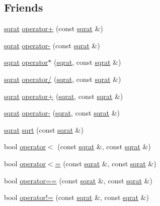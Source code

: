 \subsection*{Friends}
\begin{DoxyCompactItemize}
\item 
\mbox{\hyperlink{classsqrat}{sqrat}} \mbox{\hyperlink{classsqrat_a5a4ae2683cd1f23c81c09229d1dcc34a}{operator+}} (const \mbox{\hyperlink{classsqrat}{sqrat}} \&)
\item 
\mbox{\hyperlink{classsqrat}{sqrat}} \mbox{\hyperlink{classsqrat_ade89f3d4e5e8de405db9e23a1420d332}{operator-\/}} (const \mbox{\hyperlink{classsqrat}{sqrat}} \&)
\item 
\mbox{\hyperlink{classsqrat}{sqrat}} \mbox{\hyperlink{classsqrat_a0f75e7f8b43c76214b0845eadbfbfe6b}{operator$\ast$}} (\mbox{\hyperlink{classsqrat}{sqrat}}, const \mbox{\hyperlink{classsqrat}{sqrat}} \&)
\item 
\mbox{\hyperlink{classsqrat}{sqrat}} \mbox{\hyperlink{classsqrat_aa6e76248a9ec776743e60e5db8b3cb6d}{operator/}} (\mbox{\hyperlink{classsqrat}{sqrat}}, const \mbox{\hyperlink{classsqrat}{sqrat}} \&)
\item 
\mbox{\hyperlink{classsqrat}{sqrat}} \mbox{\hyperlink{classsqrat_a714592d215fdb454264df3d7bfbe0b5e}{operator+}} (\mbox{\hyperlink{classsqrat}{sqrat}}, const \mbox{\hyperlink{classsqrat}{sqrat}} \&)
\item 
\mbox{\hyperlink{classsqrat}{sqrat}} \mbox{\hyperlink{classsqrat_a78bb0ea9bd5a4282ba33a61c4bc073b6}{operator-\/}} (\mbox{\hyperlink{classsqrat}{sqrat}}, const \mbox{\hyperlink{classsqrat}{sqrat}} \&)
\item 
\mbox{\hyperlink{classsqrat}{sqrat}} \mbox{\hyperlink{classsqrat_aac93909598aa6f1b1b6bbe035a1af815}{sqrt}} (const \mbox{\hyperlink{classsqrat}{sqrat}} \&)
\item 
bool \mbox{\hyperlink{classsqrat_a1326bc7564a14f2fa4cbe59cdcf94b69}{operator$<$}} (const \mbox{\hyperlink{classsqrat}{sqrat}} \&, const \mbox{\hyperlink{classsqrat}{sqrat}} \&)
\item 
bool \mbox{\hyperlink{classsqrat_ae33aee8490a3137fb967fbd52b100f6d}{operator$<$=}} (const \mbox{\hyperlink{classsqrat}{sqrat}} \&, const \mbox{\hyperlink{classsqrat}{sqrat}} \&)
\item 
bool \mbox{\hyperlink{classsqrat_aa31a4a7298644b244db89e455265c946}{operator==}} (const \mbox{\hyperlink{classsqrat}{sqrat}} \&, const \mbox{\hyperlink{classsqrat}{sqrat}} \&)
\item 
bool \mbox{\hyperlink{classsqrat_ae100dba56606c0cfbbe45c04ae9f462a}{operator!=}} (const \mbox{\hyperlink{classsqrat}{sqrat}} \&, const \mbox{\hyperlink{classsqrat}{sqrat}} \&)

\end{DoxyCompactItemize}
